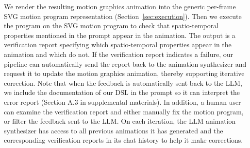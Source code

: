 We render the resulting motion graphics animation into the generic
per-frame SVG motion program representation (Section~\ref{sec:execution}).
%
Then we execute the \dslname{} program on
the SVG motion program to check that spatio-temporal properties mentioned
in the prompt appear in the animation.
%
%
The output is a verification report
specifying which spatio-temporal properties appear in the animation and which do not.
%
If the verification report indicates a failure, our pipeline can automatically send the 
report back to the animation synthesizer
and request it to update the motion graphics
animation, thereby supporting iterative correction.
%
Note that when the feedback is automatically sent back to the
LLM, we include the documentation of our \dslname{} DSL in the prompt so it
can interpret the error report (Section A.3 in supplemental materials). 
%
In addition, a human user can examine the verification report and either
manually fix the motion program, or filter the feedback sent to the
LLM. 
%
On each iteration, the LLM animation synthesizer has access to all
previous animations it has generated and the corresponding
verification reports in its chat history to help it make corrections.
%









